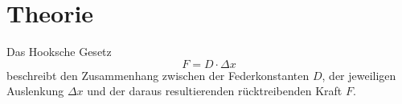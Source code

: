 \section{Theorie}
\label{sec:Theorie}
Das Hooksche Gesetz 
\begin{equation}
    F=D \cdot \Delta x 
    \label{eqn:Das Hooksche Gesetz}
\end{equation}
beschreibt den Zusammenhang zwischen der Federkonstanten $D$, der jeweiligen Auslenkung $\Delta x$ und der daraus resultierenden
rücktreibenden Kraft $F$.




